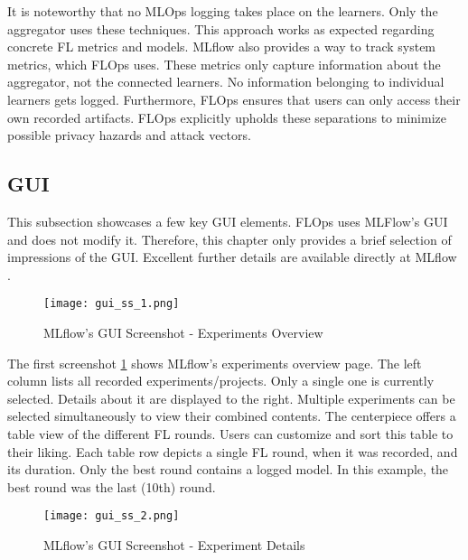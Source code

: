 It is noteworthy that no MLOps logging takes place on the learners.
Only the aggregator uses these techniques.
This approach works as expected regarding concrete FL metrics and models.
MLflow also provides a way to track system metrics, which FLOps uses.
These metrics only capture information about the aggregator, not the connected learners.
No information belonging to individual learners gets logged.
Furthermore, FLOps ensures that users can only access their own recorded artifacts.
FLOps explicitly upholds these separations to minimize possible privacy hazards and attack vectors.

\subsection{GUI}

This subsection showcases a few key GUI elements.
FLOps uses MLFlow's GUI and does not modify it.
Therefore, this chapter only provides a brief selection of impressions of the GUI.
Excellent further details are available directly at MLflow \cite{mlflow:homepage}.

\begin{figure}[p]
    \begin{adjustwidth}{-0.1\paperwidth}{-0.1\paperwidth}
        \centering
        \texttt{[image: gui\_ss\_1.png]}
        \caption{MLflow's GUI Screenshot - Experiments Overview}
        \label{fig:gui_ss_1}
    \end{adjustwidth}
\end{figure}

The first screenshot \ref{fig:gui_ss_1} shows MLflow's experiments overview page.
The left column lists all recorded experiments/projects.
Only a single one is currently selected.
Details about it are displayed to the right.
Multiple experiments can be selected simultaneously to view their combined contents.
The centerpiece offers a table view of the different FL rounds.
Users can customize and sort this table to their liking.
Each table row depicts a single FL round, when it was recorded, and its duration.
Only the best round contains a logged model.
In this example, the best round was the last (10th) round.

\begin{figure}[p]
    \begin{adjustwidth}{-0.1\paperwidth}{-0.1\paperwidth}
        \centering
        \texttt{[image: gui\_ss\_2.png]}
        \caption{MLflow's GUI Screenshot - Experiment Details}
        \label{fig:gui_ss_2}
    \end{adjustwidth}
\end{figure}

